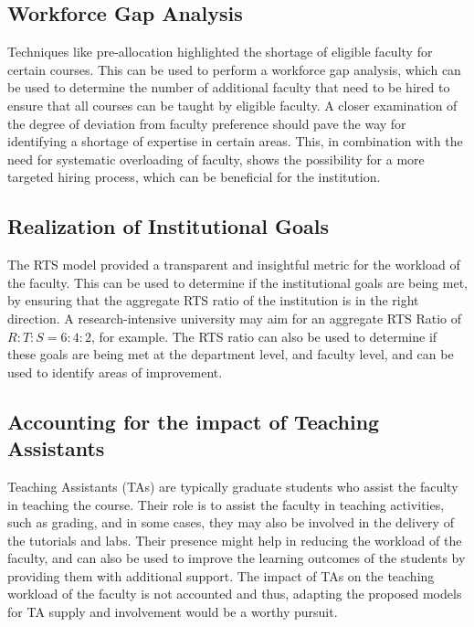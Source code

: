 \subsection{Workforce Gap Analysis}

Techniques like pre-allocation highlighted the shortage of eligible faculty for certain courses. This can be used to perform a workforce gap analysis, which can be used to determine the number of additional faculty that need to be hired to ensure that all courses can be taught by eligible faculty. A closer examination of the degree of deviation from faculty preference should pave the way for identifying a shortage of expertise in certain areas. This, in combination with the need for systematic overloading of faculty, shows the possibility for a more targeted hiring process, which can be beneficial for the institution.


\subsection{Realization of Institutional Goals}

The RTS model provided a transparent and insightful metric for the workload of the faculty. This can be used to determine if the institutional goals are being met, by ensuring that the aggregate RTS ratio of the institution is in the right direction. A research-intensive university may aim for an aggregate RTS Ratio of $R:T:S = 6:4:2$, for example. The RTS ratio can also be used to determine if these goals are being met at the department level, and faculty level, and can be used to identify areas of improvement.

\subsection{Accounting for the impact of Teaching Assistants}

Teaching Assistants (TAs) are typically graduate students who assist the faculty in teaching the course. Their role is to assist the faculty in teaching activities, such as grading, and in some cases, they may also be involved in the delivery of the tutorials and labs. Their presence might help in reducing the workload of the faculty, and can also be used to improve the learning outcomes of the students by providing them with additional support. The impact of TAs on the teaching workload of the faculty is not accounted and thus, adapting the proposed models for TA supply and involvement would be a worthy pursuit.

